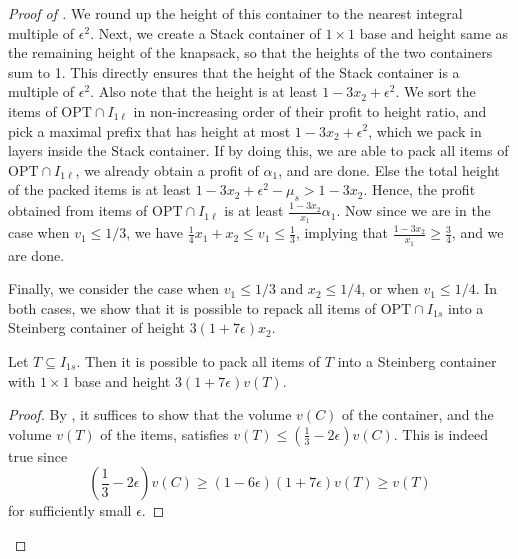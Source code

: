 \begin{proof}[Proof of ]
    We round up the height of this container to the nearest integral multiple of $\epsilon^2$. Next, we create a Stack container of $1\times 1$ base and height same as the remaining height of the knapsack, so that the heights of the two containers sum to 1. This directly ensures that the height of the Stack container is a multiple of $\epsilon^2$. Also note that the height is at least $1-3x_2 + \epsilon^2$. We sort the items of $\text{OPT}\cap I_{1\ell}$ in non-increasing order of their profit to height ratio, and pick a maximal prefix that has height at most $1-3x_2+\epsilon^2$, which we pack in layers inside the Stack container. If by doing this, we are able to pack all items of $\text{OPT}\cap I_{1\ell}$, we already obtain a profit of $\alpha_1$, and are done. Else the total height of the packed items is at least $1-3x_2+\epsilon^2-\mu_s > 1-3x_2$. Hence, the profit obtained from items of $\text{OPT}\cap I_{1\ell}$ is at least $\frac{1-3x_2}{x_1}\alpha_1$. Now since we are in the case when $v_1 \le 1/3$, we have $\frac{1}{4}x_1+x_2\le v_1\le \frac{1}{3}$, implying that $\frac{1-3x_2}{x_1}\ge \frac{3}{4}$, and we are done.
    
    
    
    
    

    Finally, we consider the case when $v_1\le 1/3$ and $x_2\le 1/4$, or when $v_1\le 1/4$. In both cases, we show that it is possible to repack all items of $\text{OPT}\cap I_{1s}$ into a Steinberg container of height $3(1+7\epsilon)x_2$. 
    
    \begin{claim}
    \label{cla:steinberg}
        Let $T\subseteq I_{1s}$. Then it is possible to pack all items of $T$ into a Steinberg container with $1\times 1$ base and height $3(1+7\epsilon)v(T)$.
    \end{claim}
    \begin{proof}
        By , it suffices to show that the volume $v(C)$ of the container, and the volume $v(T)$ of the items, satisfies $v(T) \le \left(\frac{1}{3}-2\epsilon\right)v(C)$. This is indeed true since
        \[ \left(\frac{1}{3}-2\epsilon\right)v(C) \ge (1-6\epsilon)(1+7\epsilon)v(T) \ge v(T)\]
        for sufficiently small $\epsilon$.
    \end{proof}
    

\end{proof}
